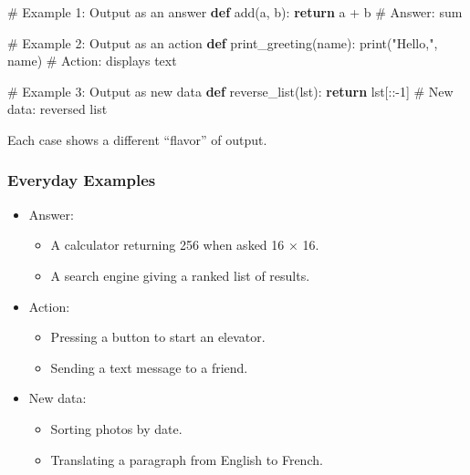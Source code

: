\documentclass[
  letterpaper,
  DIV=11,
  numbers=noendperiod]{scrreprt}
\newenvironment{Shaded}{\begin{snugshade}}{\end{snugshade}}
\newcommand{\BuiltInTok}[1]{\textcolor[rgb]{0.00,0.23,0.31}{#1}}
\newcommand{\CommentTok}[1]{\textcolor[rgb]{0.37,0.37,0.37}{#1}}
\newcommand{\ControlFlowTok}[1]{\textcolor[rgb]{0.00,0.23,0.31}{\textbf{#1}}}
\newcommand{\DecValTok}[1]{\textcolor[rgb]{0.68,0.00,0.00}{#1}}
\newcommand{\KeywordTok}[1]{\textcolor[rgb]{0.00,0.23,0.31}{\textbf{#1}}}
\newcommand{\NormalTok}[1]{\textcolor[rgb]{0.00,0.23,0.31}{#1}}
\newcommand{\OperatorTok}[1]{\textcolor[rgb]{0.37,0.37,0.37}{#1}}
\newcommand{\StringTok}[1]{\textcolor[rgb]{0.13,0.47,0.30}{#1}}
\providecommand{\tightlist}{%
  \setlength{\itemsep}{0pt}\setlength{\parskip}{0pt}}
\begin{document}
\begin{Shaded}
\begin{Highlighting}[]
\CommentTok{\# Example 1: Output as an answer}
\KeywordTok{def}\NormalTok{ add(a, b):}
    \ControlFlowTok{return}\NormalTok{ a }\OperatorTok{+}\NormalTok{ b   }\CommentTok{\# Answer: sum}

\CommentTok{\# Example 2: Output as an action}
\KeywordTok{def}\NormalTok{ print\_greeting(name):}
    \BuiltInTok{print}\NormalTok{(}\StringTok{"Hello,"}\NormalTok{, name)  }\CommentTok{\# Action: displays text}

\CommentTok{\# Example 3: Output as new data}
\KeywordTok{def}\NormalTok{ reverse\_list(lst):}
    \ControlFlowTok{return}\NormalTok{ lst[::}\OperatorTok{{-}}\DecValTok{1}\NormalTok{]   }\CommentTok{\# New data: reversed list}
\end{Highlighting}
\end{Shaded}

Each case shows a different ``flavor'' of output.

\subsubsection{Everyday Examples}\label{everyday-examples-13}

\begin{itemize}
\item
  Answer:

  \begin{itemize}
  \tightlist
  \item
    A calculator returning 256 when asked 16 × 16.
  \item
    A search engine giving a ranked list of results.
  \end{itemize}
\item
  Action:

  \begin{itemize}
  \tightlist
  \item
    Pressing a button to start an elevator.
  \item
    Sending a text message to a friend.
  \end{itemize}
\item
  New data:

  \begin{itemize}
  \tightlist
  \item
    Sorting photos by date.
  \item
    Translating a paragraph from English to French.
  \end{itemize}
\end{itemize}
\end{document}
